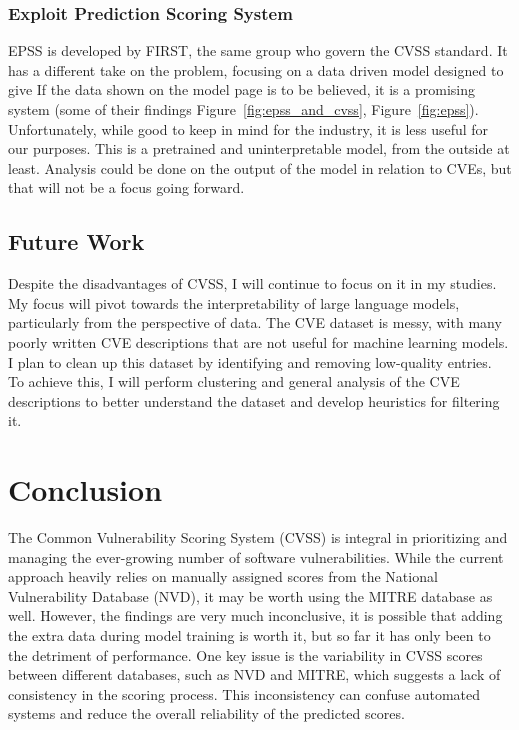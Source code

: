 \documentclass[12pt]{article}
\begin{document}
\subsubsection{Exploit Prediction Scoring System}

EPSS is developed by FIRST, the same group who govern the CVSS standard. It has a different take
on the problem, focusing on a data driven model designed to give  If the data shown on the model
page is to be believed, it is a promising system (some of their findings Figure~\ref{fig:epss_and_cvss},
Figure~\ref{fig:epss}). Unfortunately, while good to keep in mind for the industry, it is less useful
for our purposes. This is a pretrained and uninterpretable model, from the outside at least.
Analysis could be done on the output of the model in relation to CVEs, but that will not be a focus
going forward.


\subsection{Future Work}

Despite the disadvantages of CVSS, I will continue to focus on it in my studies. My focus will pivot
towards the interpretability of large language models, particularly from the perspective of data.
The CVE dataset is messy, with many poorly written CVE descriptions that are not useful for machine
learning models. I plan to clean up this dataset by identifying and removing low-quality entries. To
achieve this, I will perform clustering and general analysis of the CVE descriptions to better
understand the dataset and develop heuristics for filtering it.

\section{Conclusion}

The Common Vulnerability Scoring System (CVSS) is integral in prioritizing and managing the
ever-growing number of software vulnerabilities. While the current approach heavily relies on
manually assigned scores from the National Vulnerability Database (NVD), it may be worth using the
MITRE database as well. However, the findings are very much inconclusive, it is possible that adding
the extra data during model training is worth it, but so far it has only been to the detriment of
performance. One key issue is the variability in CVSS scores between different databases, such as NVD
and MITRE, which suggests a lack of consistency in the scoring process. This inconsistency can
confuse automated systems and reduce the overall reliability of the predicted scores.
\end{document}
